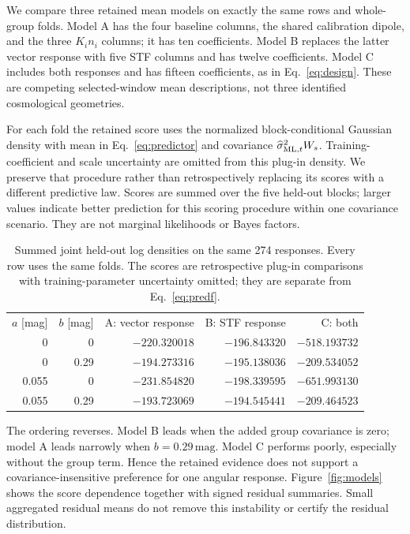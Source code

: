 We compare three retained mean models on exactly the same rows and whole-group folds. Model A has the four baseline columns, the shared calibration dipole, and the three $K_i n_i$ columns; it has ten coefficients. Model B replaces the latter vector response with five STF columns and has twelve coefficients. Model C includes both responses and has fifteen coefficients, as in Eq.~\eqref{eq:design}. These are competing selected-window mean descriptions, not three identified cosmological geometries.

For each fold the retained score uses the normalized block-conditional Gaussian density with mean in Eq.~\eqref{eq:predictor} and covariance $\widehat\sigma^2_{{\rm ML},t}W_s$. Training-coefficient and scale uncertainty are omitted from this plug-in density. We preserve that procedure rather than retrospectively replacing its scores with a different predictive law. Scores are summed over the five held-out blocks; larger values indicate better prediction for this scoring procedure within one covariance scenario. They are not marginal likelihoods or Bayes factors.

\begin{table}[htb]
\caption{Summed joint held-out log densities on the same 274 responses. Every row uses the same folds. The scores are retrospective plug-in comparisons with training-parameter uncertainty omitted; they are separate from Eq.~\eqref{eq:predf}.}
\label{tab:comparison}
\begin{ruledtabular}
\begin{tabular}{rrrrr}
$a$ [mag]&$b$ [mag]&A: vector response&B: STF response&C: both\\
0&0&$-220.320018$&$-196.843320$&$-518.193732$\\
0&0.29&$-194.273316$&$-195.138036$&$-209.534052$\\
0.055&0&$-231.854820$&$-198.339595$&$-651.993130$\\
0.055&0.29&$-193.723069$&$-194.545441$&$-209.464523$
\end{tabular}
\end{ruledtabular}
\end{table}

The ordering reverses. Model B leads when the added group covariance is zero; model A leads narrowly when $b=0.29\,\mathrm{mag}$. Model C performs poorly, especially without the group term. Hence the retained evidence does not support a covariance-insensitive preference for one angular response. Figure~\ref{fig:models} shows the score dependence together with signed residual summaries. Small aggregated residual means do not remove this instability or certify the residual distribution.

